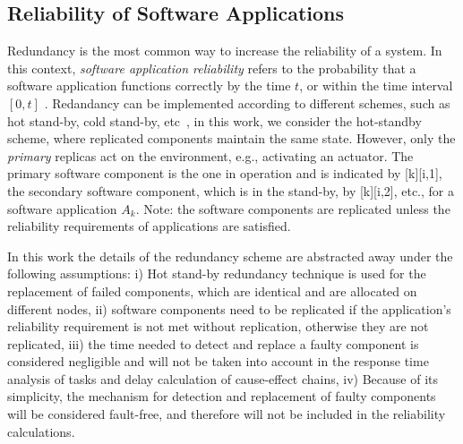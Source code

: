 {%

\subsection{Reliability of Software Applications}
Redundancy is the most common way to increase the reliability of a system. In this context, \textit{software application reliability} refers to the probability that a software application functions correctly by the time $t$, or within the time interval $[0, t]$ \cite{Goel1985SoftwareApplicability}. Redandancy can be implemented according to different schemes, such as hot stand-by, cold stand-by, etc~\cite{Dubrova2013Fault-tolerantDesign}, in this work, we consider the hot-standby scheme, where replicated components maintain the same state. However, only the \textit{primary} replicas act on the environment, e.g., activating an actuator. The primary software component is the one in operation and is indicated by [k][i,1], the secondary software component, which is in the stand-by, by [k][i,2], etc., for a software application $A_k$.  Note: the software components are replicated unless the reliability requirements of applications are satisfied.

In this work the details of the redundancy scheme are abstracted away under the following assumptions: i) Hot stand-by redundancy technique is used for the replacement of failed components, which are identical and are allocated on different nodes, ii) software components need to be replicated if the application's reliability requirement is not met without replication, otherwise they are not replicated, iii) the time needed to detect and replace a faulty component is considered negligible and will not be taken into account in the response time analysis of tasks and delay calculation of cause-effect chains, iv) Because of its simplicity, the mechanism for detection and replacement of faulty components will be considered fault-free, and therefore will not be included in the reliability calculations.

}

